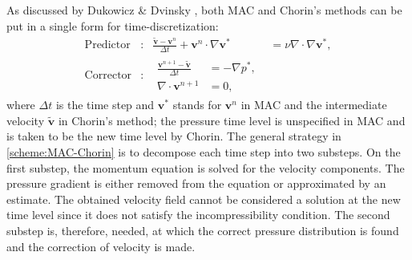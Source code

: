 \documentclass{article}
\begin{document}
As discussed by Dukowicz \& Dvinsky \cite{Dukowicz:1992}, both MAC \cite{Harlow:1965} and Chorin's \cite{Chorin:1968,Temam:1969a,Temam:1969b} methods can be put in a single form for time-discretization:
\begin{subequations}
\label{scheme:MAC-Chorin}
\begin{align}
\label{eqn:predictor}
\text{Predictor}&: & \frac{\widetilde{\boldsymbol{v}}-\boldsymbol{v}^{n}}{\Delta t} + \boldsymbol{v}^{n} \cdot \nabla \boldsymbol{v}^{*} &= \nu \nabla \cdot \nabla \boldsymbol{v}^{*}, \\
\label{eqn:corrector}
\text{Corrector}&: & 
\begin{split}
   \frac{\boldsymbol{v}^{n+1}-\widetilde{\boldsymbol{v}}}{\Delta t} &= -\nabla p^{*}, \\
   \nabla \cdot \boldsymbol{v}^{n+1} &= 0,
\end{split}
\end{align}
\end{subequations}
where $\Delta t$ is the time step and $\boldsymbol{v}^{*}$ stands for $\boldsymbol{v}^{n}$ in MAC and the intermediate velocity $\widetilde{\boldsymbol{v}}$ in Chorin's method; the pressure time level is unspecified in MAC and is taken to be the new time level by Chorin. The general strategy in \eqref{scheme:MAC-Chorin} is to decompose each time step into two substeps. On the first substep, the momentum equation is solved for the velocity components. The pressure gradient is
either removed from the equation or approximated by an estimate. The obtained velocity field cannot be considered a solution at the new time level since it does not satisfy the incompressibility condition. The second substep is, therefore, needed, at which the correct pressure distribution is found and the correction of velocity is made.
\end{document}
